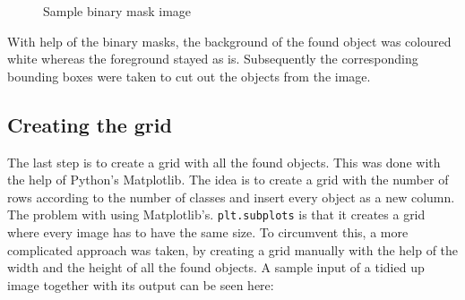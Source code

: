 \begin{figure}[H]
	\caption{\label{fig:binary-mask} Sample binary mask image}
\end{figure}

With help of the binary masks, the background of the found object was coloured white whereas the foreground stayed as is. Subsequently the corresponding bounding boxes were taken to cut out the objects from the image.

\subsection{Creating the grid}

The last step is to create a grid with all the found objects. This was done with the help of Python's Matplotlib. The idea is to create a grid with the number of rows according to the number of classes and insert every object as a new column. The problem with using Matplotlib's. \texttt{plt.subplots} is that it creates a grid where every image has to have the same size. To circumvent this, a more complicated approach was taken, by creating a grid manually with the help of the width and the height of all the found objects. A sample input of a tidied up image together with its output can be seen here:

